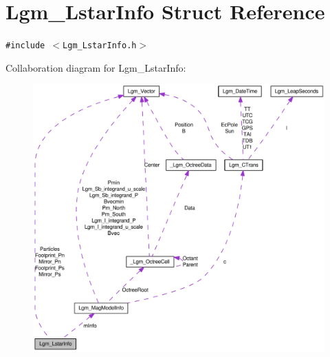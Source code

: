 \hypertarget{struct_lgm___lstar_info}{
\section{Lgm\_\-LstarInfo Struct Reference}
\label{struct_lgm___lstar_info}
}
{\tt \#include $<$Lgm\_\-LstarInfo.h$>$}

Collaboration diagram for Lgm\_\-LstarInfo:\nopagebreak
\begin{figure}[H]
\begin{center}
\leavevmode
\includegraphics[width=400pt]{struct_lgm___lstar_info__coll__graph}
\end{center}
\end{figure}
